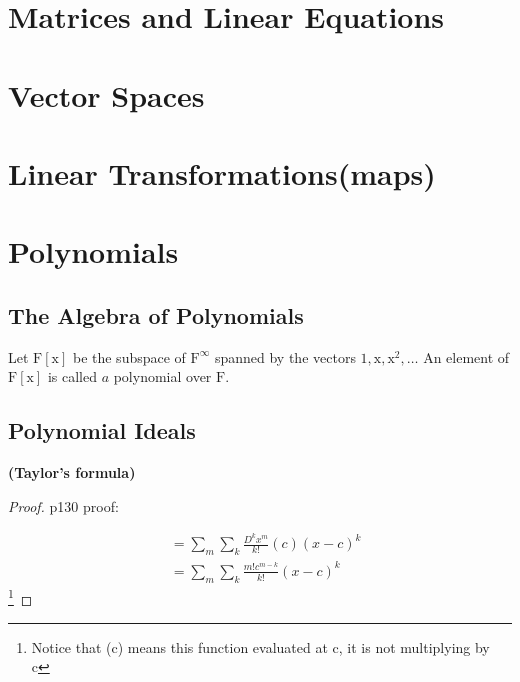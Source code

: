\documentclass[main.tex]{subfiles}
\begin{document}
\chapter{Matrices and Linear Equations}



\chapter{Vector Spaces}







\chapter{Linear Transformations(maps)}



\chapter{Polynomials}
\section{The Algebra of Polynomials}
\begin{definition}
Let $\mathrm{F}[\mathrm{x}]$ be the subspace of $\mathrm{F}^{\infty}$ spanned by the vectors $1, \mathrm{x}, \mathrm{x}^2, \ldots$ An element of $\mathrm{F}[\mathrm{x}]$ is called $a$ polynomial over $\mathrm{F}$.
\end{definition}
\section{Polynomial Ideals}
\begin{theorem}
    \textbf{(Taylor's formula)}
\end{theorem}
\begin{proof}
    p130 proof: 

\begin{align}
    &= \sum_m {\sum_k{\frac{D^k x^m}{k!}(c)(x-c)^k}} \\
    &= \sum_m {\sum_k{\frac{m! c^{m-k}}{k!}(x-c)^k}}
\end{align}
\footnote{Notice that (c) means this function evaluated at c, it is not multiplying by c}
\end{proof}
\end{document}
